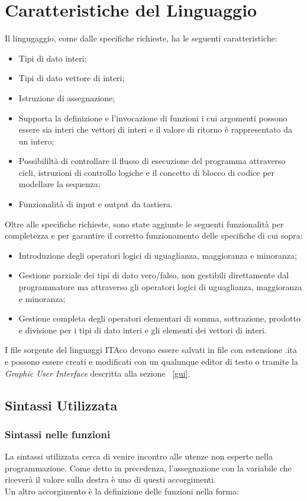 \documentclass[11pt, a4paper, twoside, notitlepage]{report}
\begin{document}
\chapter{Caratteristiche del Linguaggio}
Il lingugaggio, come dalle specifiche richieste, ha le seguenti caratteristiche:
\begin{itemize}
  \item Tipi di dato interi;
  \item Tipi di dato vettore di interi;
  \item Istruzione di assegnazione;
  \item Supporta la definizione e l'invocazione di funzioni i cui argomenti
  possono essere sia interi che vettori di interi e il valore di ritorno è
  rappresentato da un intero;
  \item Possibililtà di controllare il flusso di esecuzione del programma
  attraverso cicli, istruzioni di controllo logiche e il concetto di blocco di
  codice per modellare la sequenza;
  \item Funzionalità di input e output da tastiera.
\end{itemize}

Oltre alle specifiche richieste, sono state aggiunte le seguenti funzionalità
per completezza e per garantire il corretto funzionamento delle specifiche di
cui sopra:
\begin{itemize}
  \item Introduzione degli operatori logici di uguaglianza, maggioranza e
  minoranza;
  \item Gestione parziale dei tipi di dato vero/falso, non gestibili
  direttamente dal programmatore ma attraverso gli operatori logici di
  uguaglianza, maggioranza e minoranza;
  \item Gestione completa degli operatori elementari di somma, sottrazione,
  prodotto e divisione per i tipi di dato interi e gli elementi dei vettori di
  interi.
\end{itemize}
I file sorgente del linguaggi ITAco devono essere salvati in file con estensione
.ita e possono essere creati e modificati con un qualunque editor di testo o
tramite la \emph{Graphic User Interface} descritta alla sezione ~\ref{gui}.
\section{Sintassi Utilizzata}
\label{sintassi}
\subsection{Sintassi nelle funzioni}
La sintassi utilizzata cerca di venire incontro alle utenze non esperte nella
programmazione. Come detto in precedenza, l'assegnazione con la variabile che
riceverà il valore sulla destra è uno di questi accorgimenti.
\\Un altro accorgimento è la definizione delle funzioni nella forma:
\end{document}

